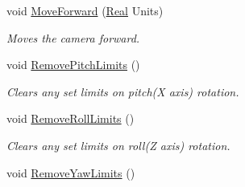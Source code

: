 \begin{DoxyCompactItemize}
void \hyperlink{classphys_1_1CameraController_a8763326e900562dd6e934f79d52d5d50}{MoveForward} (\hyperlink{namespacephys_af7eb897198d265b8e868f45240230d5f}{Real} Units)
\begin{DoxyCompactList}\small\item\em Moves the camera forward. \item\end{DoxyCompactList}\item 
\hypertarget{classphys_1_1CameraController_a19478dd2688262f9652410a630dfa731}{
void \hyperlink{classphys_1_1CameraController_a19478dd2688262f9652410a630dfa731}{RemovePitchLimits} ()}
\label{classphys_1_1CameraController_a19478dd2688262f9652410a630dfa731}

\begin{DoxyCompactList}\small\item\em Clears any set limits on pitch(X axis) rotation. \item\end{DoxyCompactList}\item 
\hypertarget{classphys_1_1CameraController_ad2ea07b9eb9c4ebc1d753a7376c307b3}{
void \hyperlink{classphys_1_1CameraController_ad2ea07b9eb9c4ebc1d753a7376c307b3}{RemoveRollLimits} ()}
\label{classphys_1_1CameraController_ad2ea07b9eb9c4ebc1d753a7376c307b3}

\begin{DoxyCompactList}\small\item\em Clears any set limits on roll(Z axis) rotation. \item\end{DoxyCompactList}\item 
\hypertarget{classphys_1_1CameraController_a356fa13a243b5f3645576b9b857ce085}{
void \hyperlink{classphys_1_1CameraController_a356fa13a243b5f3645576b9b857ce085}{RemoveYawLimits} ()}
\label{classphys_1_1CameraController_a356fa13a243b5f3645576b9b857ce085}


\end{DoxyCompactItemize}
